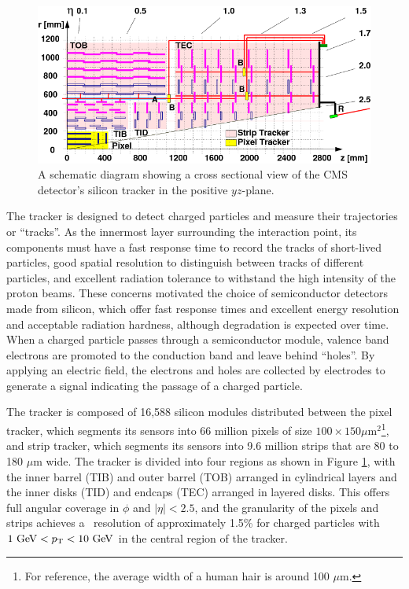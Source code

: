 \begin{figure}[htbp]
  \centering
    \includegraphics[width=5.5in]{images/tracker_diagram}
    \caption[Schematic for the CMS Silicon Tracker]{A schematic diagram showing a cross sectional view of the CMS detector's silicon tracker in the positive $yz$-plane.\cite{TRACKERDIAGRAM}}
    \label{fig:CMStrackerdiag}
\end{figure}

The tracker is designed to detect charged particles and measure their trajectories or ``tracks''. As the innermost layer surrounding the interaction point, its components must have a fast response time to record the tracks of short-lived particles, good spatial resolution to distinguish between tracks of different particles, and excellent radiation tolerance to withstand the high intensity of the proton beams. These concerns motivated the choice of semiconductor detectors made from silicon, which offer fast response times and excellent energy resolution and acceptable radiation hardness, although degradation is expected over time. When a charged particle passes through a semiconductor module, valence band electrons are promoted to the conduction band and leave behind ``holes''. By applying an electric field, the electrons and holes are collected by electrodes to generate a signal indicating the passage of a charged particle. 

The tracker is composed of 16,588 silicon modules distributed between the pixel tracker, which segments its sensors into 66 million pixels of size $100 \times 150 \mu\mathrm{m}^{2}$\footnote{For reference, the average width of a human hair is around 100 $\mu\mathrm{m}$.}, and strip tracker, which segments its sensors into 9.6 million strips that are 80 to 180 $\mu\mathrm{m}$ wide. The tracker is divided into four regions as shown in Figure \ref{fig:CMStrackerdiag}, with the inner barrel (TIB) and outer barrel (TOB) arranged in cylindrical layers and the inner disks (TID) and endcaps (TEC) arranged in layered disks. This offers full angular coverage in $\phi$ and $\left| \eta \right| < 2.5$, and the granularity of the pixels and strips achieves a \pT\ resolution of approximately 1.5\% for charged particles with $1\ \mathrm{GeV} < p_{\mathrm{T}} < 10\ \mathrm{GeV}$ in the central region of the tracker.\cite{CMSTRACKERPERF}

